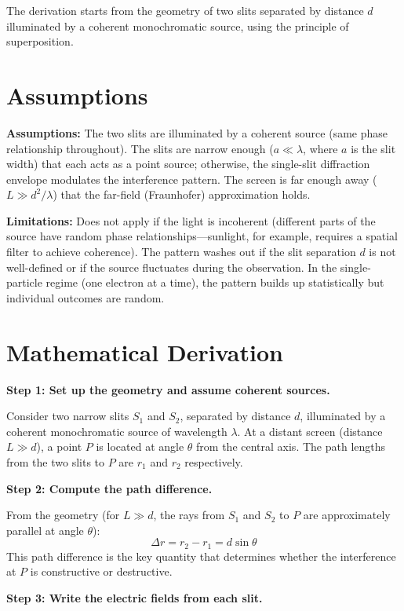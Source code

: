 The derivation starts from the geometry of two slits separated by distance $d$ illuminated by a coherent monochromatic source, using the principle of superposition.

\section*{Assumptions}

\textbf{Assumptions:} The two slits are illuminated by a coherent source (same phase relationship throughout). The slits are narrow enough ($a \ll \lambda$, where $a$ is the slit width) that each acts as a point source; otherwise, the single-slit diffraction envelope modulates the interference pattern. The screen is far enough away ($L \gg d^2/\lambda$) that the far-field (Fraunhofer) approximation holds.


\textbf{Limitations:} Does not apply if the light is incoherent (different parts of the source have random phase relationships---sunlight, for example, requires a spatial filter to achieve coherence). The pattern washes out if the slit separation $d$ is not well-defined or if the source fluctuates during the observation. In the single-particle regime (one electron at a time), the pattern builds up statistically but individual outcomes are random.


\section*{Mathematical Derivation}

\textbf{Step 1: Set up the geometry and assume coherent sources.}

Consider two narrow slits $S_1$ and $S_2$, separated by distance $d$, illuminated by a coherent monochromatic source of wavelength $\lambda$. At a distant screen (distance $L \gg d$), a point $P$ is located at angle $\theta$ from the central axis. The path lengths from the two slits to $P$ are $r_1$ and $r_2$ respectively.

\textbf{Step 2: Compute the path difference.}

From the geometry (for $L \gg d$, the rays from $S_1$ and $S_2$ to $P$ are approximately parallel at angle $\theta$):
\begin{equation}
\Delta r = r_2 - r_1 = d\sin\theta
\end{equation}
This path difference is the key quantity that determines whether the interference at $P$ is constructive or destructive.

\textbf{Step 3: Write the electric fields from each slit.}

